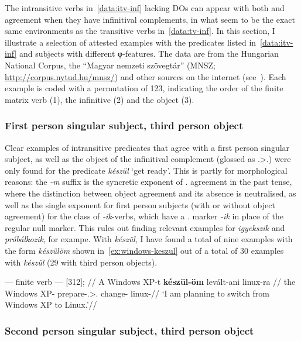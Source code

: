 The intransitive verbs in~\eqref{data:itv-inf} lacking \Acc{} \glspl{DO} can
appear with both \Sbj{} and \Obj{} agreement when they have infinitival
complements, in what seem to be the exact same environments as the transitive
verbs in~\eqref{data:tv-inf}.
%
In this section, I illustrate a selection of attested examples with the
predicates listed in~\eqref{data:itv-inf} and subjects with different
φ-features. The data are from the Hungarian National Corpus, the
\enquote{Magyar nemzeti szövegtár} (MNSZ; \url{http://corpus.nytud.hu/mnsz/})
and other sources on the internet (see~). Each example is
coded with a permutation of 123, indicating the order of the finite matrix verb
(1), the infinitive (2) and the object (3).

\subsubsection{First person singular subject, third person
object}\label{ssub:fsg-obj}

Clear examples of intransitive predicates that agree with a first person
singular subject, as well as the object of the infinitival complement (glossed
as \Fsg.\Sbj>\Third.\Obj) were only found for the predicate \emph{készül}
\enquote*{get ready}. This is partly for morphological reasons: the \emph{-m}
suffix is the syncretic exponent of \Fsg.\Sbj{} agreement in the past tense,
where the distinction between object agreement and its absence is neutralised,
as well as the single exponent for first person subjects (with or without
object agreement) for the class of \emph{-ik}-verbs, which have a \Third.\Sg{}
marker \emph{-ik} in place of the regular null marker. This rules out finding
relevant examples for \emph{igyekszik} and \emph{próbálkozik}, for exampe. With
\emph{készül}, I have found a total of nine examples with the form
\emph{készülöm} shown in~\eqref{ex:windows-keszul} out of a total of 30
examples with \emph{készül} (29 with third person objects).

\ex\label{ex:windows-keszul}%
    \begingl
        \glpreamble \Obj{} --- finite verb --- \Inf{} [312];
        //
        \gla 	A {Windows XP}-t \textbf{készül-öm} levált-ani linux-ra \nogloss{\dots}//
        \glb 	the {Windows XP}-\Acc{} prepare-\Fsg.\Sbj>\Third.\Obj{} change-\Inf{} linux-\Subl{}//
        \glft 	\enquote*{I am planning to switch from Windows XP to Linux.}//
    \endgl
\xe

\subsubsection{Second person singular subject, third person object}\label{sub:2-3}

